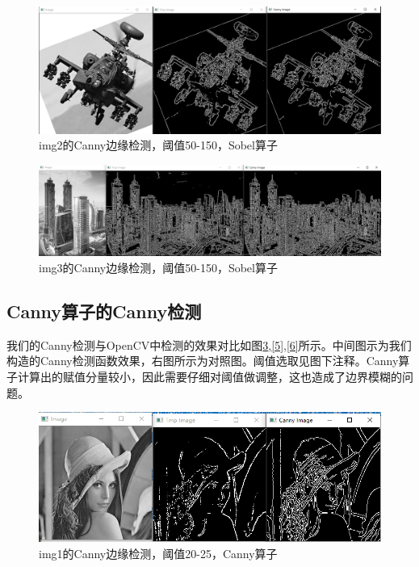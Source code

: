 \documentclass{article}
\begin{document}
\begin{figure}[htbp]
\centering
\includegraphics[width=13.5cm]{img/1-2.png}
\caption{img2的Canny边缘检测，阈值50-150，Sobel算子}
\label{2}
\end{figure}

\begin{figure}[htbp]
\centering
\includegraphics[width=13.5cm]{img/1-3.png}
\caption{img3的Canny边缘检测，阈值50-150，Sobel算子}
\label{3}
\end{figure}


\subsection{Canny算子的Canny检测}
我们的Canny检测与OpenCV中检测的效果对比如图\ref{4},\ref{5},\ref{6}所示。中间图示为我们构造的Canny检测函数效果，右图所示为对照图。阈值选取见图下注释。Canny算子计算出的赋值分量较小，因此需要仔细对阈值做调整，这也造成了边界模糊的问题。

\begin{figure}[htbp]
\centering
\includegraphics[width=13.5cm]{img/2-1.png}
\caption{img1的Canny边缘检测，阈值20-25，Canny算子}
\label{4}
\end{figure}
\end{document}

